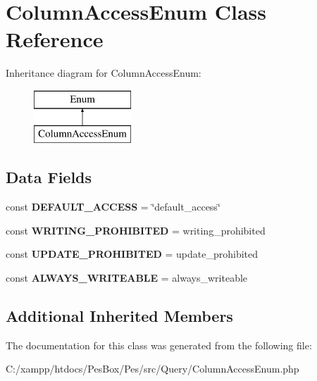 \hypertarget{class_pes_1_1_query_1_1_column_access_enum}{}\section{Column\+Access\+Enum Class Reference}
\label{class_pes_1_1_query_1_1_column_access_enum}
Inheritance diagram for Column\+Access\+Enum\+:\begin{figure}[H]
\begin{center}
\leavevmode
\includegraphics[height=2.000000cm]{class_pes_1_1_query_1_1_column_access_enum}
\end{center}
\end{figure}
\subsection*{Data Fields}
\begin{DoxyCompactItemize}
\item 
\mbox{\label{class_pes_1_1_query_1_1_column_access_enum_a466f8e09ec640a1e24ecf067683e9455}} 
const {\bfseries D\+E\+F\+A\+U\+L\+T\+\_\+\+A\+C\+C\+E\+SS} = \char`\"{}default\+\_\+access\char`\"{}
\item 
\mbox{\label{class_pes_1_1_query_1_1_column_access_enum_a412fb2d7fda6ce779a0c290855ce120f}} 
const {\bfseries W\+R\+I\+T\+I\+N\+G\+\_\+\+P\+R\+O\+H\+I\+B\+I\+T\+ED} = \textquotesingle{}writing\+\_\+prohibited\textquotesingle{}
\item 
\mbox{\label{class_pes_1_1_query_1_1_column_access_enum_a300bcb062ba719f0e17dd22987e9b716}} 
const {\bfseries U\+P\+D\+A\+T\+E\+\_\+\+P\+R\+O\+H\+I\+B\+I\+T\+ED} = \textquotesingle{}update\+\_\+prohibited\textquotesingle{}
\item 
\mbox{\label{class_pes_1_1_query_1_1_column_access_enum_a72d20db18b1ae6f43da2793bce23a682}} 
const {\bfseries A\+L\+W\+A\+Y\+S\+\_\+\+W\+R\+I\+T\+E\+A\+B\+LE} = \textquotesingle{}always\+\_\+writeable\textquotesingle{}
\end{DoxyCompactItemize}
\subsection*{Additional Inherited Members}


The documentation for this class was generated from the following file\+:\begin{DoxyCompactItemize}
\item 
C\+:/xampp/htdocs/\+Pes\+Box/\+Pes/src/\+Query/Column\+Access\+Enum.\+php\end{DoxyCompactItemize}
